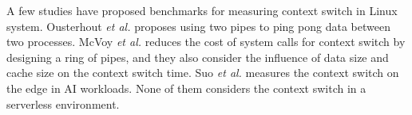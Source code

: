 A few studies\cite{cs-arm,cs-datasize,cs-lmbench,cs-pipes} have proposed benchmarks for measuring context switch in Linux system.
Ousterhout \emph{et al.}\cite{cs-pipes} proposes using two pipes to ping pong data between two processes.
McVoy \emph{et al.}\cite{cs-lmbench} reduces the cost of system calls for context switch by designing a ring of pipes,
and they also consider the influence of data size and cache size on the context switch time\cite{cs-datasize}.
Suo \emph{et al.}\cite{cs-cloud} measures the context switch on the edge in AI workloads. 
None of them considers the context switch in a serverless environment.

